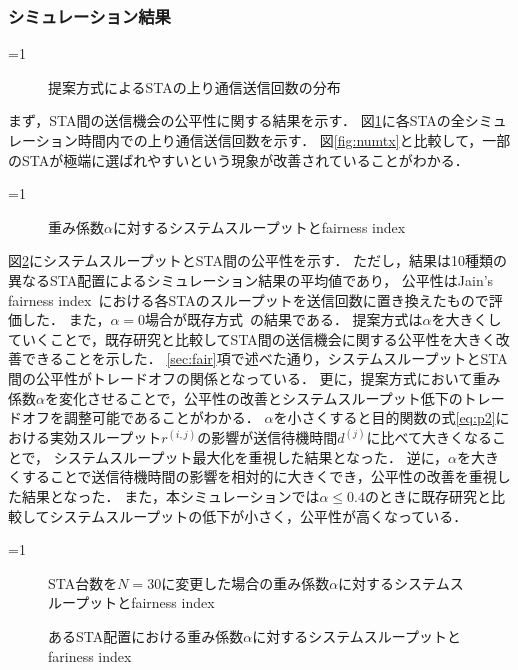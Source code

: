 \documentclass[master]{kuisthesis}		%
\newcommand{\sij}{(i,j)}
\newcommand{\rij}{r^{\sij}}
\newcounter{flagFig}
\begin{document}
		\subsubsection{シミュレーション結果}
			\ifnum\value{flagFig}=1 {\begin{figure}[htbp]
				\centering
				\caption{提案方式によるSTAの上り通信送信回数の分布}
				\label{fig:fair}
			\end{figure}}\fi
			まず，STA間の送信機会の公平性に関する結果を示す．
			図\ref{fig:fair}に各STAの全シミュレーション時間内での上り通信送信回数を示す．
			図\ref{fig:numtx}と比較して，一部のSTAが極端に選ばれやすいという現象が改善されていることがわかる．
			\par
			\ifnum\value{flagFig}=1 {\begin{figure}[htbp]
				\centering
				\caption{重み係数$\alpha$に対するシステムスループットとfairness index}
				\label{fig:thr_fair}
			\end{figure}}\fi
			図\ref{fig:thr_fair}にシステムスループットとSTA間の公平性を示す．
			ただし，結果は10種類の異なるSTA配置によるシミュレーション結果の平均値であり，
			公平性はJain's fairness index~\cite{jain}における各STAのスループットを送信回数に置き換えたもので評価した．
			また，$\alpha=0$場合が既存方式~\cite{promac}の結果である．
			提案方式は$\alpha$を大きくしていくことで，既存研究と比較してSTA間の送信機会に関する公平性を大きく改善できることを示した．
			\ref{sec:fair}項で述べた通り，システムスループットとSTA間の公平性がトレードオフの関係となっている．
			更に，提案方式において重み係数$\alpha$を変化させることで，公平性の改善とシステムスループット低下のトレードオフを調整可能であることがわかる．
			$\alpha$を小さくすると目的関数の式\eqref{eq:p2}における実効スループット$\rij$の影響が送信待機時間$d^{(j)}$に比べて大きくなることで，
			システムスループット最大化を重視した結果となった．
			逆に，$\alpha$を大きくすることで送信待機時間の影響を相対的に大きくでき，公平性の改善を重視した結果となった．
			また，本シミュレーションでは$\alpha\leq0.4$のときに既存研究と比較してシステムスループットの低下が小さく，公平性が高くなっている．
			\par
			\ifnum\value{flagFig}=1 {\begin{figure}[htbp]
				\centering
				\caption{STA台数を$N=30$に変更した場合の重み係数$\alpha$に対するシステムスループットとfairness index}
				\label{fig:chgnum}

				\caption{あるSTA配置における重み係数$\alpha$に対するシステムスループットとfariness index}
				\label{fig:chgtopology}
			\end{figure}}\fi
\end{document}
